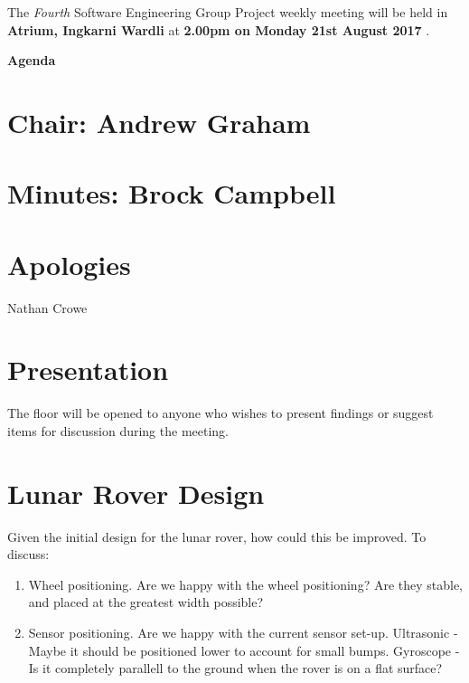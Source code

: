 \documentclass[11pt, a4paper]{article}
\newcommand{\meetingno}{ Fourth }
\newcommand{\meetinglocation}{ Atrium, Ingkarni Wardli } %
\newcommand{\meetingdatetime}{ 2.00pm on Monday 21st August 2017 } %
\newcommand{\meetingchair}{ Andrew Graham } %
\newcommand{\meetingminutes}{ Brock Campbell } %
\begin{document}
  \noindent The {\em \meetingno} Software Engineering Group Project weekly meeting will be held in {\bf \meetinglocation } at {\bf \meetingdatetime }.

  \vspace*{15pt}

  \begin{center}
  \huge \bf Agenda
  \end{center}

  \begin{flushleft}
  
  \section*{Chair: \meetingchair }
  \section*{Minutes: \meetingminutes }
  
  \vspace*{10pt}

  \section{Apologies}
	Nathan Crowe

  \section{Presentation}
	The floor will be opened to anyone who wishes to present findings or suggest items for discussion during the meeting.
  
  \section{Lunar Rover Design }
  	Given the initial design for the lunar rover, how could this be improved.
    To discuss:
	\begin{enumerate}
    \item Wheel positioning. Are we happy with the wheel positioning?
   	Are they stable, and placed at the greatest width possible?
    \item Sensor positioning. Are we happy with the current sensor set-up. 
    Ultrasonic - Maybe it should be positioned lower to account for small bumps.
    Gyroscope - Is it completely parallell to the ground when the rover is on a flat surface?
    \end{enumerate}

  

\end{flushleft}
\end{document}
